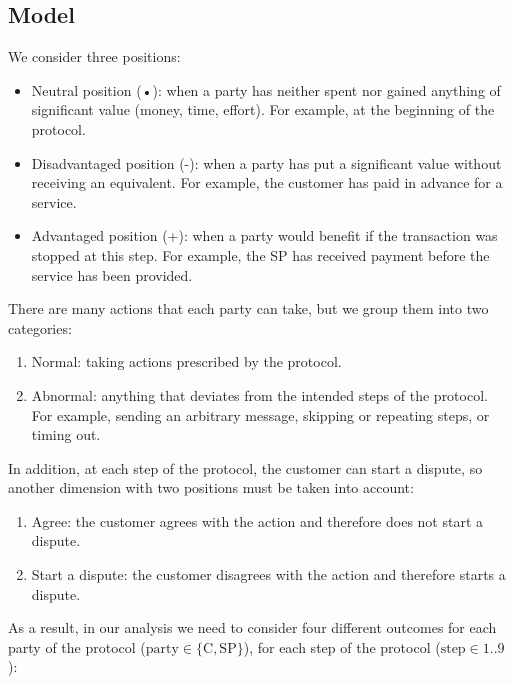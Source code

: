 \documentclass[pdftex,twocolumn,epjc3]{svjour3}
\begin{document}
{\subsection{Model}\label{sec:fairness-model}
We consider three positions:

\begin{itemize}
\item Neutral position (•): when a party has neither spent nor gained anything of significant value (money, time, effort). For example, at the beginning of the protocol.
\item Disadvantaged position (-): when a party has put a significant value without receiving an equivalent. For example, the customer has paid in advance for a service.
\item Advantaged position (+): when a party would benefit if the transaction was stopped at this step. For example, the SP has received payment before the service has been provided.
\end{itemize}

There are many actions that each party can take, but we group them into two categories:


\begin{enumerate}
\def\labelenumi{\arabic{enumi}.}

\item Normal: taking actions prescribed by the protocol.
\item Abnormal: anything that deviates from the intended steps of the protocol. For example, sending an arbitrary message, skipping or repeating steps, or timing out.
\end{enumerate}

In addition, at each step of the protocol, the customer can start a dispute, so another dimension with two positions must be taken into account:

\begin{enumerate}
\def\labelenumi{\arabic{enumi}.}

\item Agree: the customer agrees with the action and therefore does not start a dispute.
\item Start a dispute: the customer disagrees with the action and therefore starts a dispute.
\end{enumerate}

As a result, in our analysis we need to consider four different outcomes for each party of the protocol ($\mathrm{party \in \{C, SP}\}$), for each step of the protocol ($\mathrm{step \in 1..9}$):

}
\end{document}
